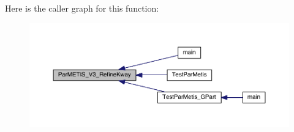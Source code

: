 Here is the caller graph for this function\+:\nopagebreak
\begin{figure}[H]
\begin{center}
\leavevmode
\includegraphics[width=350pt]{3rd_party_2parmetis-4_80_83_2include_2parmetis_8h_ad40a7809c9bdf183926da011220bad75_icgraph}
\end{center}
\end{figure}
